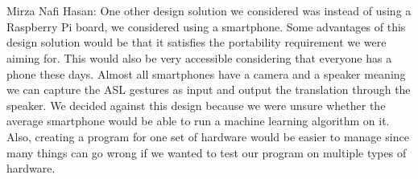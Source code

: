 \documentclass[12pt, titlepage]{article}
\begin{document}
\begin{enumerate}
  ~\\
  \\
    Mirza Nafi Hasan: One other design solution we considered was instead of using a Raspberry Pi board, we considered using a smartphone. Some advantages of 
    this design solution would be that it satisfies the portability requirement we were aiming for. This would also be very accessible considering that everyone
    has a phone these days. Almost all smartphones have a camera and a speaker meaning we can capture the ASL gestures as input and output the translation 
    through the speaker. We decided against this design because we were unsure whether the average smartphone would be able to run a machine learning algorithm
    on it. Also, creating a program for one set of hardware would be easier to manage since many things can go wrong if we wanted to test our program on 
    multiple types of hardware.
  \\
\end{enumerate}
\end{document}
